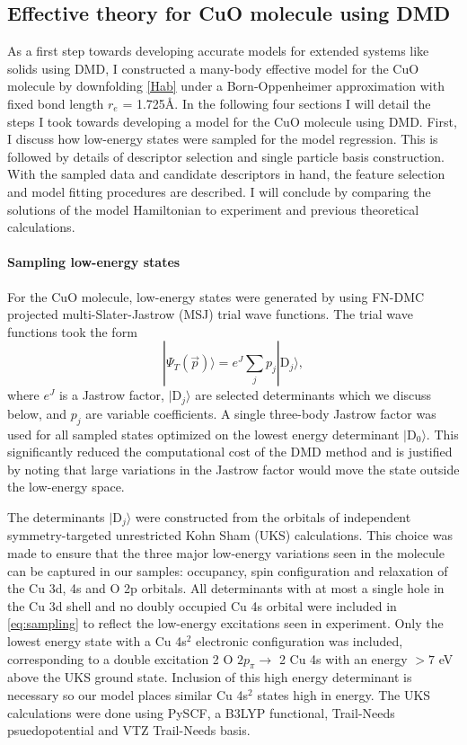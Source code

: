 \documentclass[12pt]{article}
\begin{document}
\subsection{Effective theory for CuO molecule using DMD}
As a first step towards developing accurate models for extended systems like solids using DMD, I constructed a many-body effective model for the CuO molecule by downfolding \eqref{Hab} under a Born-Oppenheimer approximation with fixed bond length $r_e$ = 1.725\r{A}.
In the following four sections I will detail the steps I took towards developing a model for the CuO molecule using DMD.
First, I discuss how low-energy states were sampled for the model regression.
This is followed by details of descriptor selection and single particle basis construction.
With the sampled data and candidate descriptors in hand, the feature selection and model fitting procedures are described.
I will conclude by comparing the solutions of the model Hamiltonian to experiment and previous theoretical calculations.

\paragraph{Sampling low-energy states}
For the CuO molecule, low-energy states were generated by using FN-DMC projected multi-Slater-Jastrow (MSJ) trial wave functions.
The trial wave functions took the form
\begin{equation}
|\Psi_T(\vec{p}) \rangle =  e^{J}\sum_{j} p_j|\text{D}_j\rangle,
\label{eq:sampling}
\end{equation}
where $e^J$ is a Jastrow factor, $|\text{D}_j\rangle$ are selected determinants which we discuss below, and $p_j$ are variable coefficients.
A single three-body Jastrow factor was used for all sampled states optimized on the lowest energy determinant $|\text{D}_0 \rangle$.
This significantly reduced the computational cost of the DMD method and is justified by noting that large variations in the Jastrow factor would move the state outside the low-energy space.

The determinants $|\text{D}_j \rangle$ were constructed from the orbitals of independent symmetry-targeted unrestricted Kohn Sham (UKS) calculations.
This choice was made to ensure that the three major low-energy variations seen in the molecule can be captured in our samples: occupancy, spin configuration and relaxation of the Cu 3d, 4s and O 2p orbitals.
All determinants with at most a single hole in the Cu 3d shell and no doubly occupied Cu 4s orbital were included in \eqref{eq:sampling} to reflect the low-energy excitations seen in experiment.
Only the lowest energy state with a Cu 4s$^2$ electronic configuration was included, corresponding to a double excitation 2 O ${2p_\pi} \rightarrow$ 2 Cu 4s with an energy $>7$ eV above the UKS ground state.
Inclusion of this high energy determinant is necessary so our model places similar Cu 4s$^2$ states high in energy.
The UKS calculations were done using PySCF, a B3LYP functional, Trail-Needs psuedopotential and VTZ Trail-Needs basis.
\end{document}
